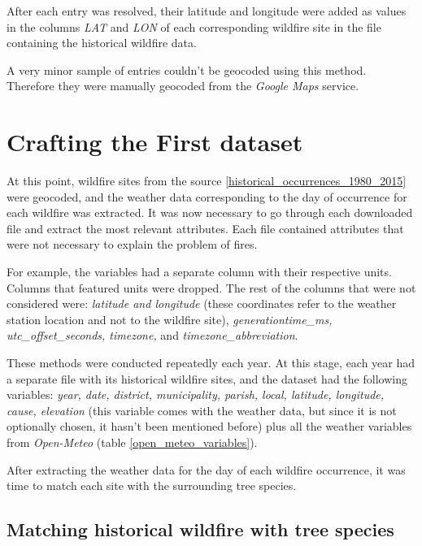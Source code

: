 After each entry was resolved, their latitude and longitude were added as values in the columns \textit{LAT} and \textit{LON} of each corresponding wildfire site in the file containing the historical wildfire data.


A very minor sample of entries couldn't be geocoded using this method. Therefore they were manually geocoded from the \textit{Google Maps} service. 



\section{Crafting the First dataset}
\label{the_first_dataset}
At this point, wildfire sites from the source \ref{historical_occurrences_1980_2015} were geocoded, and the weather data corresponding to the day of occurrence for each wildfire was extracted. It was now necessary to go through each downloaded file and extract the most relevant attributes. Each file contained attributes that were not necessary to explain the problem of fires. 


For example, the variables had a separate column with their respective units. Columns that featured units were dropped. The rest of the columns that were not considered were: \textit{latitude and longitude} (these coordinates refer to the weather station location and not to the wildfire site), \textit{generationtime\_ms, utc\_offset\_seconds, timezone,} and \textit{timezone\_abbreviation}. 

These methods were conducted repeatedly each year. At this stage, each year had a separate file with its historical wildfire sites, and the dataset had the following variables: \textit{year, date, district, municipality, parish, local, latitude, longitude, cause, elevation} (this variable comes with the weather data, but since it is not optionally chosen, it hasn't been mentioned before) plus all the weather variables from \textit{Open-Meteo} (table \ref{open_meteo_variables}).


After extracting the weather data for the day of each wildfire occurrence, it was time to match each site with the surrounding tree species. 



\subsection{Matching historical wildfire with tree species}
\label{tree_species_wildfires}

